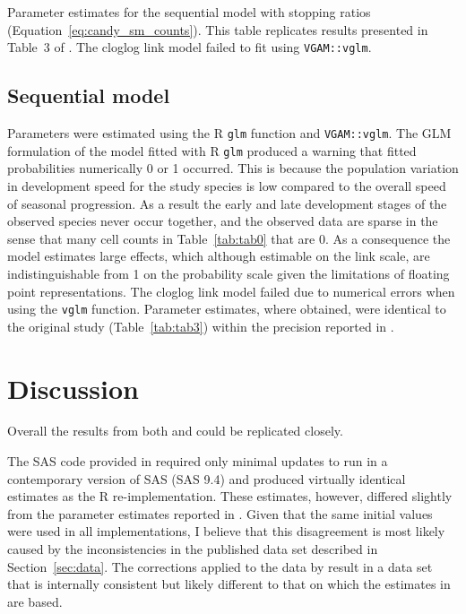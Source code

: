 \begin{table}[htb]
  \small
    \centering
    \caption{Parameter estimates for the sequential model with stopping ratios (Equation~\ref{eq:candy_sm_counts}). 
    This table replicates results presented in Table~3 of \citep{candy1991modeling}. 
    The cloglog link model failed to fit using \texttt{VGAM::vglm}.}
  
  \label{tab:tab3}
\end{table}

\subsection{Sequential model}
\label{sec:sm-results}
Parameters were estimated using the R \verb+glm+ function and \verb+VGAM::vglm+. 
The GLM formulation of the model fitted with R \verb+glm+ produced a warning that fitted probabilities numerically 0 or 1 occurred. This is because the population variation in development speed for the study species is low compared to the overall speed of seasonal progression.
As a result the early and late development stages of the observed species never occur together, and the observed data are sparse in the sense that many cell counts in Table~\ref{tab:tab0} that are 0.
As a consequence the model estimates large effects, which although estimable on the link scale, are indistinguishable from 1 on the probability scale given the limitations of floating point representations. 
The cloglog link model failed due to numerical errors when using the \verb+vglm+ function. 
Parameter estimates, where obtained, were identical to the original study (Table~\ref{tab:tab3}) within the precision reported in \citep{candy1991modeling}.

\section{Discussion}
Overall the results from both \citep{dennis1986stochastic} and \citep{candy1991modeling} could be replicated closely.

The SAS code provided in \citep{dennis1986stochastic} required only minimal updates to run in a contemporary version of SAS (SAS 9.4) and produced virtually identical estimates as the R re-implementation. 
These estimates, however, differed slightly from the parameter estimates reported in \citep{kemp1986stochastic}. 
Given that the same initial values were used in all implementations, I believe that this disagreement is most likely caused by the inconsistencies in the published data set described in Section~\ref{sec:data}. 
The corrections applied to the data by \citep{candy1991modeling} result in a data set that is internally consistent but likely different to that on which the estimates in \citep{kemp1986stochastic} are based.  

